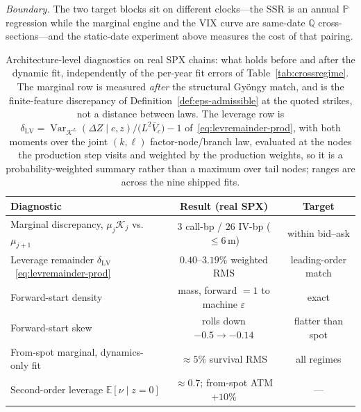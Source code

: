 \documentclass[11pt]{article}
\newcommand{\E}{\mathbb{E}}
\newcommand{\Var}{\operatorname{Var}}
\newcommand{\cK}{\mathcal{K}}
\providecommand{\1}{\mathbf 1}
\begin{document}
\emph{Boundary.} The two target blocks sit on different clocks---the SSR is an annual $\mathbb P$
regression while the marginal engine and the VIX curve are same-date $\mathbb Q$
cross-sections---and the static-date experiment above measures the cost of that pairing.

\begin{table}[htbp]
\centering
{\small
\begin{tabular}{lcc}
\toprule
Diagnostic & Result (real SPX) & Target \\
\midrule
Marginal discrepancy, $\mu_j\cK_j$ vs.\ $\mu_{j+1}$ & $3$ call-bp / $26$ IV-bp (${\le}6$\,m) & within bid--ask \\
Leverage remainder $\delta_{\mathrm{LV}}$~\eqref{eq:levremainder-prod} & $0.40$--$3.19\%$ weighted RMS & leading-order match \\
Forward-start density & mass, forward $=1$ to machine $\varepsilon$ & exact \\
Forward-start skew & rolls down $-0.5\to-0.14$ & flatter than spot \\
From-spot marginal, dynamics-only fit & ${\approx}5\%$ survival RMS & all regimes \\
Second-order leverage $\E[\nu\mid z{=}0]$ & $\approx0.7$; from-spot ATM ${+}10\%$ & --- \\
\bottomrule
\end{tabular}}
\caption{Architecture-level diagnostics on real SPX chains: what holds before and after the dynamic
fit, independently of the per-year fit errors of Table~\ref{tab:crossregime}. The marginal row is
measured \emph{after} the structural Gy\"ongy match, and is the finite-feature discrepancy of
Definition~\ref{def:eps-admissible} at the quoted strikes, not a distance between laws. The
leverage row is
$\delta_{\mathrm{LV}}=\Var_{\cK^{L}}(\Delta Z\mid c,z)/\bigl(L^2\overline V_c\bigr)-1$
of~\eqref{eq:levremainder-prod}, with both moments over the joint $(k,\ell)$ factor-node/branch law,
evaluated at the nodes the production step visits and weighted by the production weights, so it is a
probability-weighted summary rather than a maximum over tail nodes; ranges are across the nine
shipped fits.}
\label{tab:realdata}
\end{table}
\end{document}
